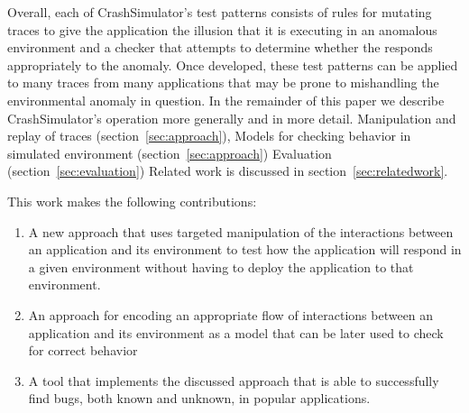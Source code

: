 Overall, each of CrashSimulator's test patterns consists of rules for mutating traces to give the application the
illusion that it is executing in an anomalous environment and a checker 
that attempts to determine whether the responds appropriately to the anomaly.
Once developed, these test patterns can be applied to many traces from many applications that may be prone to mishandling the environmental anomaly in question.
In the remainder of this paper we describe CrashSimulator's operation more generally and in more detail.
Manipulation and replay of traces (section~\ref{sec:approach}),
Models for checking behavior in simulated environment (section~\ref{sec:approach})
Evaluation (section~\ref{sec:evaluation})
Related work is discussed in section~\ref{sec:relatedwork}.

		This work makes the following contributions:

    \begin{enumerate}
        \item{A new approach that uses targeted manipulation of the interactions between an application and its
            environment to test how the application will respond in a given environment without having to deploy
            the application to that environment.}
        \item{An approach for encoding an appropriate flow of interactions between an application and its environment as
            a model that can be later used to check for correct behavior}
        \item{A tool that implements the discussed approach that is able to successfully find bugs, both known and
            unknown, in popular applications.}
    \end{enumerate}


